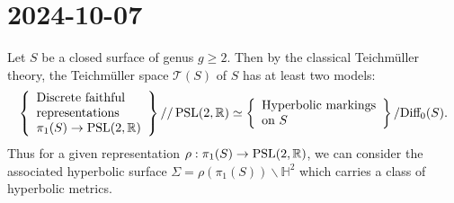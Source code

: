 \documentclass{report}
\begin{document}
\section{2024-10-07}
Let $S$ be a closed surface of genus $g \geq 2$.
Then by the classical Teichmüller theory, the Teichmüller space $\mathcal T(S)$ of $S$ has at least two models:
\[
\left\{
\begin{array}{l}
    \text{Discrete faithful}\\
    \text{representations } \\
    \pi_1(S) \to \text{PSL}(2, \mathbb R) \\
\end{array}
\right\}
//\operatorname{{\mathrm{PSL}}}(2, \mathbb R) \simeq \left\{ 
    \begin{array}{l}
    \text{Hyperbolic markings}\\
    \text{on } S    
    \end{array}
    \right\}/\text{Diff}_0(S).
\]
Thus for a given representation $\rho: \pi_1(S) \to \operatorname{{\mathrm{PSL}}}(2, \mathbb R)$, we can consider the associated hyperbolic surface $\Sigma = \rho(\pi_1(S)) \backslash \mathbb H^2$ which carries a class of hyperbolic metrics.
\end{document}
